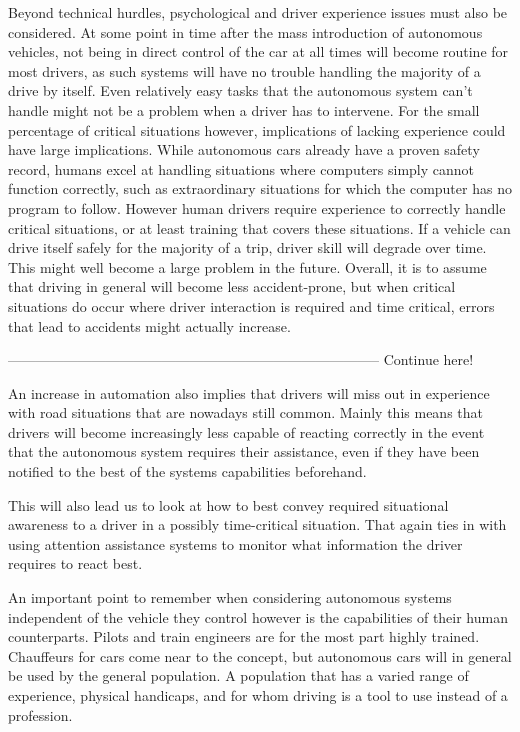 \documentclass{acm_proc_article-sp}
\begin{document}
Beyond technical hurdles, psychological and driver experience issues must also be considered.
At some point in time after the mass introduction of autonomous vehicles, not being in direct control of the car at all times will become routine for most drivers, as such systems will have no trouble handling the majority of a drive by itself.
Even relatively easy tasks that the autonomous system can't handle might not be a problem when a driver has to intervene.
For the small percentage of critical situations however, implications of lacking experience could have large implications.
While autonomous cars already have a proven safety record, humans excel at handling situations where computers simply cannot function correctly, such as extraordinary situations for which the computer has no program to follow.
However human drivers require experience to correctly handle critical situations, or at least training that covers these situations.
If a vehicle can drive itself safely for the majority of a trip, driver skill will degrade over time.
This might well become a large problem in the future.
Overall, it is to assume that driving in general will become less accident-prone, but when critical situations do occur where driver interaction is required and time critical, errors that lead to accidents might actually increase.

--------------------------------------------------------------------------------
Continue here!

An increase in automation also implies that drivers will miss out in experience with road situations that are nowadays still common.
Mainly this means that drivers will become increasingly less capable of reacting correctly in the event that the autonomous system requires their assistance, even if they have been notified to the best of the systems capabilities beforehand.

This will also lead us to look at how to best convey required situational awareness to a driver in a possibly time-critical situation.
That again ties in with using attention assistance systems to monitor what information the driver requires to react best.

An important point to remember when considering autonomous systems independent of the vehicle they control however is the capabilities of their human counterparts.
Pilots and train engineers are for the most part highly trained.
Chauffeurs for cars come near to the concept, but autonomous cars will in general be used by the general population.
A population that has a varied range of experience, physical handicaps, and for whom driving is a tool to use instead of a profession.
\end{document}
